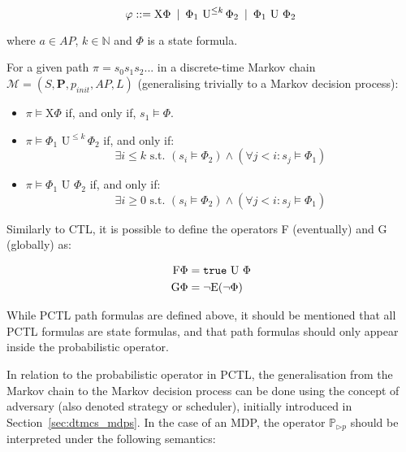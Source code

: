 {\begin{defi}
{\begin{equation}
	\varphi ::= \text{X} \Phi \:\mid\: \Phi_1 \text{ U}^{\leq k}\, \Phi_2 \:\mid\: \Phi_1 \text{ U } \Phi_2
\end{equation}

where $a \in AP$, $k \in \mathbb{N}$ and $\Phi$ is a state formula.

For a given path $\pi = s_0s_1s_2...$ in a discrete-time Markov chain $\mathcal{M} = (S, \mathbf{P}, p_{init}, AP, L)$ (generalising trivially to a Markov decision process):
\begin{itemize}
	\item $\pi \models \text{X}\Phi$ if, and only if, $s_1 \models \Phi$.
	\item $\pi \models \Phi_1\text{ U}^{\leq k}\, \Phi_2$ if, and only if:
	 \begin{equation}
	 	\exists i \leq k \text{ s.t. } (s_i \models \Phi_2) \wedge (\forall j < i: s_j \models \Phi_1)
	\end{equation}
	\item $\pi \models \Phi_1\text{ U }\Phi_2$ if, and only if:
	 \begin{equation}
	 	\exists i \geq 0 \text{ s.t. } (s_i \models \Phi_2) \wedge (\forall j < i: s_j \models \Phi_1)
	\end{equation}
\end{itemize}

Similarly to CTL, it is possible to define the operators F (eventually) and G (globally) as:

\begin{equation}
\begin{aligned}
	\text{F} \Phi & = \text{\texttt{true}} \text{ U } \Phi \\
	\text{G} \Phi & = \neg \text{E} (\neg \Phi)
\end{aligned}
\end{equation}

}
\end{defi}}

While PCTL path formulas are defined above, it should be mentioned that all PCTL formulas are state formulas, and that path formulas should only appear inside the probabilistic operator. 

In relation to the probabilistic operator in PCTL, the generalisation from the Markov chain to the Markov decision process can be done using the concept of adversary (also denoted strategy or scheduler), initially introduced in Section~\ref{sec:dtmcs_mdps}. In the case of an MDP, the operator $\mathbb{P}_{\triangleright p}$ should be interpreted under the following semantics:

